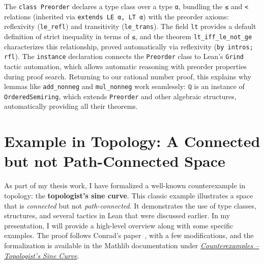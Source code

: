 The \lstinline[language=lean]|class Preorder| declares a type class over a type
\lstinline[language=lean]|α|, bundling the \lstinline[language=lean]|≤|
and \lstinline[language=lean]|<| relations
(inherited via \lstinline[language=lean]|extends LE α, LT α|)
with the preorder axioms: reflexivity (\lstinline[language=lean]|le_refl|)
and transitivity (\lstinline[language=lean]|le_trans|).
The field \lstinline[language=lean]|lt| provides a default definition of strict
inequality in terms of \lstinline[language=lean]|≤|,
and the theorem \lstinline[language=lean]|lt_iff_le_not_ge| characterizes this relationship,
proved automatically via reflexivity (\lstinline[language=lean]|by intros; rfl|).
The \lstinline[language=lean]|instance| declaration connects the \lstinline[language=lean]|Preorder|
class to Lean's \lstinline[language=lean]|Grind| tactic automation, which allows automatic
reasoning with preorder properties during proof search.
Returning to our rational number proof, this explains why lemmas
like \lstinline[language=lean]|add_nonneg| and \lstinline[language=lean]|mul_nonneg|
work seamlessly: \lstinline[language=lean]|ℚ| is an instance of
\lstinline[language=lean]|OrderedSemiring|, which extends
\lstinline[language=lean]|Preorder| and other algebraic structures,
automatically providing all their theorems.

\section{Example in Topology: A Connected but not Path-Connected Space}

As part of my thesis work, I have formalized a well-known counterexample in topology: the \textbf{topologist’s sine curve}.
This classic example illustrates a space that is \emph{connected} but not \emph{path-connected}.
It demonstrates the use of type classes, structures, and several tactics in Lean that were discussed earlier.
In my presentation, I will provide a high-level overview along with some specific examples.
The proof follows Conrad’s paper~\cite{Conrad_connnotpathconn}, with a few modifications, and the formalization is available in the Mathlib documentation under \href{https://leanprover-community.github.io/mathlib4_docs/Counterexamples/TopologistsSineCurve.html}{\emph{Counterexamples – Topologist’s Sine Curve}}.

